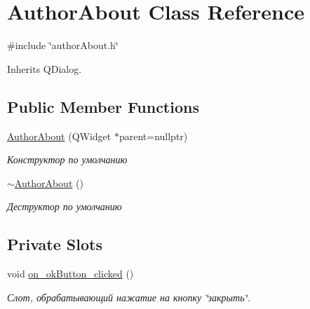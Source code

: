 \hypertarget{class_author_about}{}\section{Author\+About Class Reference}
\label{class_author_about}


{\ttfamily \#include \char`\"{}author\+About.\+h\char`\"{}}



Inherits Q\+Dialog.

\subsection*{Public Member Functions}
\begin{DoxyCompactItemize}
\item 
\mbox{\label{class_author_about_a4df2bfe51bc4339f8e006a672bad71c6}} 
\mbox{\hyperlink{class_author_about_a4df2bfe51bc4339f8e006a672bad71c6}{Author\+About}} (Q\+Widget $\ast$parent=nullptr)
\begin{DoxyCompactList}\small\item\em Конструктор по умолчанию \end{DoxyCompactList}\item 
\mbox{\label{class_author_about_ae0fd7130cdd2c07ef09a97dc5424e741}} 
\mbox{\hyperlink{class_author_about_ae0fd7130cdd2c07ef09a97dc5424e741}{$\sim$\+Author\+About}} ()
\begin{DoxyCompactList}\small\item\em Деструктор по умолчанию \end{DoxyCompactList}\end{DoxyCompactItemize}
\subsection*{Private Slots}
\begin{DoxyCompactItemize}
\item 
\mbox{\label{class_author_about_a4e5e3e845c9c72d4bef6cfe3f43e98cd}} 
void \mbox{\hyperlink{class_author_about_a4e5e3e845c9c72d4bef6cfe3f43e98cd}{on\+\_\+ok\+Button\+\_\+clicked}} ()
\begin{DoxyCompactList}\small\item\em Слот, обрабатывающий нажатие на кнопку \char`\"{}закрыть\char`\"{}. \end{DoxyCompactList}\end{DoxyCompactItemize}
